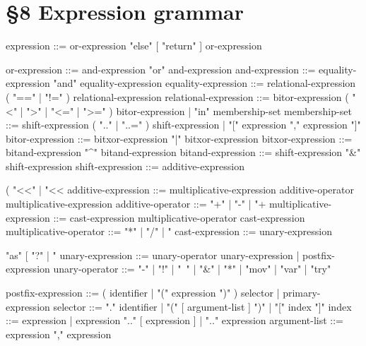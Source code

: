\section*{§8 Expression grammar}
\label{gram:expression}
\begin{grammar}
expression            ::= or-expression { "else" [ "return" ] or-expression }

or-expression         ::= and-expression { "or" and-expression }
and-expression        ::= equality-expression { "and" equality-expression }
equality-expression   ::= relational-expression
                          { ( "==" | "!=" ) relational-expression }
relational-expression ::= bitor-expression
                          { ( "<" | ">" | "<=" | ">=" ) bitor-expression
                          | "in" membership-set }
membership-set        ::= shift-expression ( ".." | "..=" ) shift-expression
                        | "[" expression { "," expression } "]"
bitor-expression      ::= bitxor-expression { "|" bitxor-expression }
bitxor-expression     ::= bitand-expression { "^" bitand-expression }
bitand-expression     ::= shift-expression { "&" shift-expression }
shift-expression      ::= additive-expression
                          { ( "<<" | "<<%
additive-expression   ::= multiplicative-expression
                          { additive-operator multiplicative-expression }
additive-operator     ::= "+" | "-" | "+%
multiplicative-expression ::= cast-expression
                          { multiplicative-operator cast-expression }
multiplicative-operator   ::= "*" | "/" | "%
cast-expression       ::= unary-expression { "as" [ "?" | "%
unary-expression      ::= unary-operator unary-expression
                        | postfix-expression
unary-operator        ::= "-" | "!" | "~" | "&" | "*" | "mov" | "var" | "try"

postfix-expression    ::= ( identifier | "(" expression ")" ) { selector }
                        | primary-expression
selector              ::= "." identifier
                        | "(" [ argument-list ] ")"
                        | "[" index "]"
index                 ::= expression
                        | expression ".." [ expression ]
                        | ".." expression
argument-list         ::= expression { "," expression }


}}
\end{grammar}

